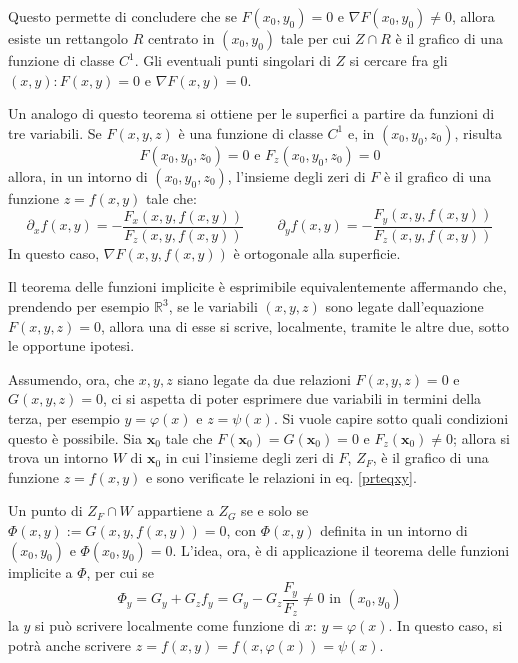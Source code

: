 \documentclass[10pt, a4paper]{scrartcl}
\theoremstyle{definition}
\numberwithin{esempio}{section}
\theoremstyle{definition}
\numberwithin{obs}{section}
\numberwithin{nota}{section}
\numberwithin{equation}{subsection}
\begin{document}
Questo permette di concludere che se $F(x_0,y_0) = 0$ e $\nabla F (x_0,y_0) \neq 0 $, allora esiste un rettangolo $R$ centrato in $(x_0,y_0)$ tale per cui $Z \cap R$ \`e il grafico di una funzione di classe $C^1$.
Gli eventuali punti singolari di $Z$ si cercare fra gli $(x,y) : F(x,y) = 0 $ e $\nabla F(x,y) = 0$.

Un analogo di questo teorema si ottiene per le superfici a partire da funzioni di tre variabili. 
Se $F(x,y,z)$ \`e una funzione di classe $C^1$ e, in $(x_0,y_0,z_0)$, risulta
\[
F (x_0,y_0,z_0) = 0 \text{ e } F_z(x_0,y_0,z_0)=0
\] 
allora, in un intorno di $(x_0,y_0,z_0)$, l'insieme degli zeri di $F$ \`e il grafico di una funzione $z=f(x,y)$ tale che:
\begin{equation}\label{prteqxy}
	\partial _x f (x,y) = - \frac{F_x(x,y,f(x,y))}{F_z(x,y,f(x,y))} \hspace{1cm} \partial _y f(x,y) = - \frac{F_y(x,y,f(x,y))}{F_z(x,y,f(x,y))}
\end{equation}
In questo caso, $\nabla F(x,y,f(x,y))$ \`e ortogonale alla superficie.


Il teorema delle funzioni implicite \`e esprimibile equivalentemente affermando che, prendendo per esempio $\mathbb{R}^3$, se le variabili $(x,y,z)$ sono legate dall'equazione $F(x,y,z) = 0$, allora una di esse si scrive, localmente, tramite le altre due, sotto le opportune ipotesi.

Assumendo, ora, che $x,y,z$ siano legate da due relazioni $F(x,y,z) = 0$ e $G(x,y,z) = 0$, ci si aspetta di poter esprimere due variabili in termini della terza, per esempio $y = \varphi (x)$ e $z = \psi (x)$.
Si vuole capire sotto quali condizioni questo \`e possibile.
Sia $\mathbf{x} _0$ tale che $F(\mathbf{x} _0) = G(\mathbf{x} _0) = 0$ e $F_z (\mathbf{x} _0) \neq 0$; allora si trova un intorno $W$ di $\mathbf{x} _0$ in cui l'insieme degli zeri di $F$, $Z_F$, \`e il grafico di una funzione $z=f(x,y)$ e sono verificate le relazioni in eq. \ref{prteqxy}.

Un punto di $Z_F \cap W	$ appartiene a $Z_G$ se e solo se $\Phi(x,y):= G(x,y,f(x,y))=0$, con $\Phi(x,y)$ definita in un intorno di $(x_0,y_0)$ e $\Phi(x_0,y_0)=0$.
L'idea, ora, \`e di applicazione il teorema delle funzioni implicite a $\Phi$, per cui se 
\[
\Phi_y = G_y + G_z f_y = G_y - G_z \frac{F_y}{F_z} \neq 0 \text{ in } (x_0,y_0)
\] 
la $y$ si pu\`o scrivere localmente come funzione di $x$: $y=  \varphi (x)$.
In questo caso, si potr\`a anche scrivere $z= f(x,y) = f(x,\varphi (x))=\psi (x)$.
\end{document}
